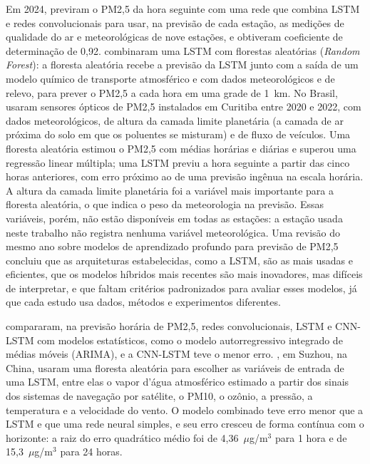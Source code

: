 Em 2024,  previram o PM2,5 da hora seguinte com uma rede que combina LSTM e redes convolucionais para usar, na previsão de cada estação, as medições de qualidade do ar e meteorológicas de nove estações, e obtiveram coeficiente de determinação de 0,92.  combinaram uma LSTM com florestas aleatórias (\textit{Random Forest}): a floresta aleatória recebe a previsão da LSTM junto com a saída de um modelo químico de transporte atmosférico e com dados meteorológicos e de relevo, para prever o PM2,5 a cada hora em uma grade de 1~km. No Brasil,  usaram sensores ópticos de PM2,5 instalados em Curitiba entre 2020 e 2022, com dados meteorológicos, de altura da camada limite planetária (a camada de ar próxima do solo em que os poluentes se misturam) e de fluxo de veículos. Uma floresta aleatória estimou o PM2,5 com médias horárias e diárias e superou uma regressão linear múltipla; uma LSTM previu a hora seguinte a partir das cinco horas anteriores, com erro próximo ao de uma previsão ingênua na escala horária. A altura da camada limite planetária foi a variável mais importante para a floresta aleatória, o que indica o peso da meteorologia na previsão. Essas variáveis, porém, não estão disponíveis em todas as estações: a estação usada neste trabalho não registra nenhuma variável meteorológica. Uma revisão do mesmo ano sobre modelos de aprendizado profundo para previsão de PM2,5 \cite{pm25_review_2024} concluiu que as arquiteturas estabelecidas, como a LSTM, são as mais usadas e eficientes, que os modelos híbridos mais recentes são mais inovadores, mas difíceis de interpretar, e que faltam critérios padronizados para avaliar esses modelos, já que cada estudo usa dados, métodos e experimentos diferentes.

 compararam, na previsão horária de PM2,5, redes convolucionais, LSTM e CNN-LSTM com modelos estatísticos, como o modelo autorregressivo integrado de médias móveis (ARIMA), e a CNN-LSTM teve o menor erro. , em Suzhou, na China, usaram uma floresta aleatória para escolher as variáveis de entrada de uma LSTM, entre elas o vapor d'água atmosférico estimado a partir dos sinais dos sistemas de navegação por satélite, o PM10, o ozônio, a pressão, a temperatura e a velocidade do vento. O modelo combinado teve erro menor que a LSTM e que uma rede neural simples, e seu erro cresceu de forma contínua com o horizonte: a raiz do erro quadrático médio foi de 4,36~\(\mu\)g/m\(^3\) para 1 hora e de 15,3~\(\mu\)g/m\(^3\) para 24 horas.


